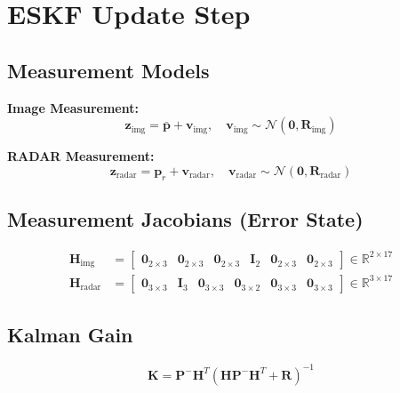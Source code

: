 \documentclass[11pt,a4paper]{article}
\newcommand{\pr}{\mathbf{p}_r}
\newcommand{\pbar}{\bar{\mathbf{p}}}
\newcommand{\I}{\mathbf{I}}
\begin{document}
\section{ESKF Update Step}

\subsection{Measurement Models}

\textbf{Image Measurement:}
\begin{equation}
    \mathbf{z}_{\text{img}} = \pbar + \mathbf{v}_{\text{img}}, \quad \mathbf{v}_{\text{img}} \sim \mathcal{N}(\mathbf{0}, \mathbf{R}_{\text{img}})
\end{equation}

\textbf{RADAR Measurement:}
\begin{equation}
    \mathbf{z}_{\text{radar}} = \pr + \mathbf{v}_{\text{radar}}, \quad \mathbf{v}_{\text{radar}} \sim \mathcal{N}(\mathbf{0}, \mathbf{R}_{\text{radar}})
\end{equation}

\subsection{Measurement Jacobians (Error State)}
\begin{align}
    \mathbf{H}_{\text{img}} &= \begin{bmatrix} \mathbf{0}_{2\times 3} & \mathbf{0}_{2\times 3} & \mathbf{0}_{2\times 3} & \I_2 & \mathbf{0}_{2\times 3} & \mathbf{0}_{2\times 3} \end{bmatrix} \in \mathbb{R}^{2 \times 17} \\[8pt]
    \mathbf{H}_{\text{radar}} &= \begin{bmatrix} \mathbf{0}_{3\times 3} & \I_3 & \mathbf{0}_{3\times 3} & \mathbf{0}_{3\times 2} & \mathbf{0}_{3\times 3} & \mathbf{0}_{3\times 3} \end{bmatrix} \in \mathbb{R}^{3 \times 17}
\end{align}

\subsection{Kalman Gain}
\begin{equation}
    \mathbf{K} = \mathbf{P}^- \mathbf{H}^T \left(\mathbf{H} \mathbf{P}^- \mathbf{H}^T + \mathbf{R}\right)^{-1}
\end{equation}
\end{document}
